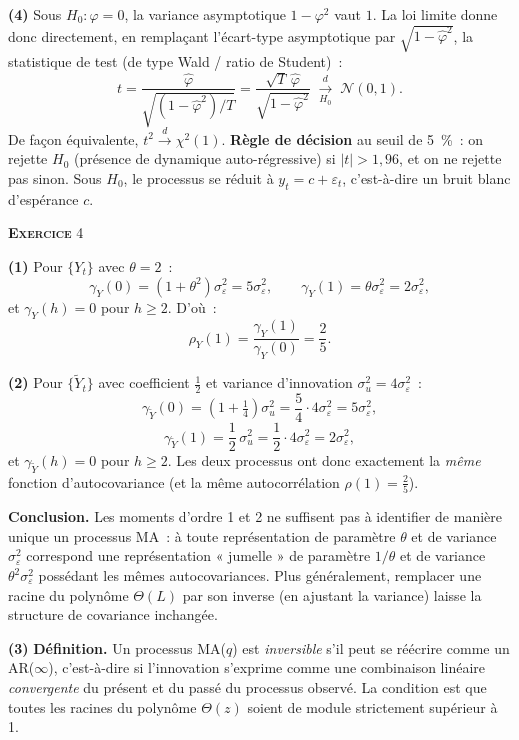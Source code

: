 \documentclass[11pt,a4paper,notitlepage]{article}
\newcommand{\exercice}[1]{\textsc{\textbf{Exercice}} #1}
\newcommand{\question}[1]{\textbf{(#1)}}
\begin{document}
\question{4} Sous $H_0:\varphi=0$, la variance asymptotique
$1-\varphi^2$ vaut $1$. La loi limite donne donc directement, en
remplaçant l'écart-type asymptotique par $\sqrt{1-\hat\varphi^2}$, la
statistique de test (de type Wald / ratio de Student)~:
\[
t = \frac{\hat\varphi}{\sqrt{(1-\hat\varphi^2)/T}}
= \frac{\sqrt T\,\hat\varphi}{\sqrt{1-\hat\varphi^2}}
\;\xrightarrow[H_0]{d}\; \mathcal N(0,1).
\]
De façon équivalente, $t^2 \xrightarrow{d}\chi^2(1)$. \textbf{Règle de
décision} au seuil de 5~\%~: on rejette $H_0$ (présence de dynamique
auto-régressive) si $|t| > 1{,}96$, et on ne rejette pas sinon. Sous
$H_0$, le processus se réduit à $y_t = c + \varepsilon_t$, c'est-à-dire
un bruit blanc d'espérance $c$.

\bigskip

\exercice{4}\newline

\question{1} Pour $\{Y_t\}$ avec $\theta = 2$~:
\[
\gamma_Y(0) = (1+\theta^2)\sigma_{\varepsilon}^2 = 5\sigma_{\varepsilon}^2,\qquad
\gamma_Y(1) = \theta\sigma_{\varepsilon}^2 = 2\sigma_{\varepsilon}^2,
\]
et $\gamma_Y(h)=0$ pour $h\geq 2$. D'où~:
\[
\rho_Y(1) = \frac{\gamma_Y(1)}{\gamma_Y(0)} = \frac{2}{5}.
\]
\newline

\question{2} Pour $\{\tilde Y_t\}$ avec coefficient $\frac{1}{2}$ et
variance d'innovation $\sigma_u^2 = 4\sigma_{\varepsilon}^2$~:
\[
\gamma_{\tilde Y}(0) = \left(1+\tfrac{1}{4}\right)\sigma_u^2
= \frac{5}{4}\cdot 4\sigma_{\varepsilon}^2 = 5\sigma_{\varepsilon}^2,
\]
\[
\gamma_{\tilde Y}(1) = \frac{1}{2}\,\sigma_u^2
= \frac{1}{2}\cdot 4\sigma_{\varepsilon}^2 = 2\sigma_{\varepsilon}^2,
\]
et $\gamma_{\tilde Y}(h)=0$ pour $h\geq 2$. Les deux processus ont donc
exactement la \emph{même} fonction d'autocovariance (et la même
autocorrélation $\rho(1)=\frac{2}{5}$).\newline

\textbf{Conclusion.} Les moments d'ordre 1 et 2 ne suffisent pas à
identifier de manière unique un processus MA~: à toute représentation
de paramètre $\theta$ et de variance $\sigma_{\varepsilon}^2$
correspond une représentation « jumelle » de paramètre $1/\theta$ et de
variance $\theta^2\sigma_{\varepsilon}^2$ possédant les mêmes
autocovariances. Plus généralement, remplacer une racine du polynôme
$\Theta(L)$ par son inverse (en ajustant la variance) laisse la
structure de covariance inchangée.\newline

\question{3} \textbf{Définition.} Un processus MA($q$) est
\emph{inversible} s'il peut se réécrire comme un AR($\infty$),
c'est-à-dire si l'innovation s'exprime comme une combinaison linéaire
\emph{convergente} du présent et du passé du processus observé. La
condition est que toutes les racines du polynôme $\Theta(z)$ soient de
module strictement supérieur à 1.\newline
\end{document}
